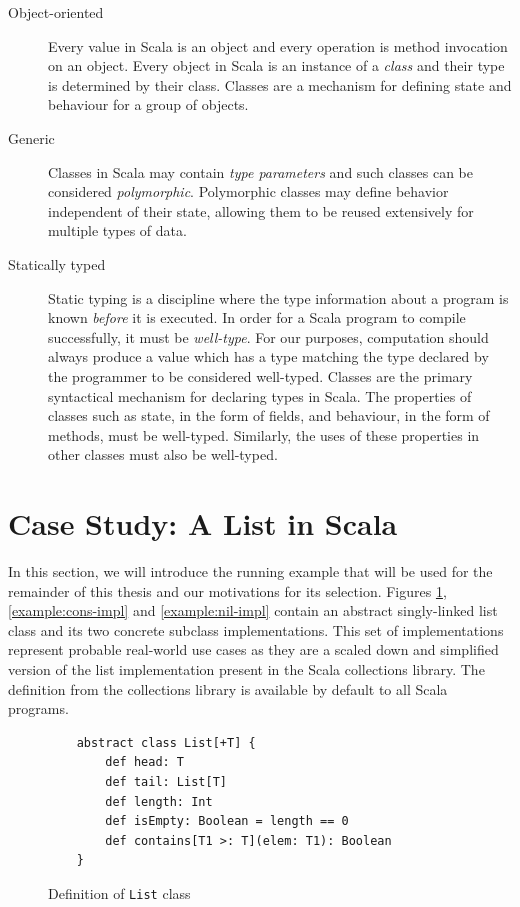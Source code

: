 \begin{description}
	\item[Object-oriented] 
	Every value in Scala is an object and every operation is method invocation on an object. 
	Every object in Scala is an instance of a \textit{class} and their type is determined by their class.
	Classes\cite{simula:classes} are a mechanism for defining state and behaviour for a group of objects.	
	
	\item[Generic] 
	Classes in Scala may contain \textit{type parameters} and such classes can be considered \textit{polymorphic}\cite{strachey:fundamental-concepts}.
	Polymorphic classes may define behavior independent of their state, allowing them to be reused extensively for multiple types of data.
	
	\item[Statically typed] 
	Static typing is a discipline where the type information about a program is known \textit{before} it is executed.
	In order for a Scala program to compile successfully, it must be \textit{well-type}.
	For our purposes, computation should always produce a value which has a type matching the type declared by the programmer to be considered well-typed.
	Classes are the primary syntactical mechanism for declaring types in Scala. 
	The properties of classes such as state, in the form of fields, and behaviour, in the form of methods, must be well-typed.
	Similarly, the uses of these properties in other classes must also be well-typed. 
\end{description}

\section{Case Study: A List in Scala}

In this section, we will introduce the running example that will be used for the remainder of this thesis and our motivations for its selection.
Figures \ref{example:list-def}, \ref{example:cons-impl} and \ref{example:nil-impl} contain an abstract singly-linked list class and its two concrete subclass implementations. 
This set of  implementations represent probable real-world use cases as they are a scaled down and simplified version of the list implementation present in the Scala collections library.
The  definition from the collections library is available by default to all Scala programs.

\begin{figure}[!htb]
	\begin{verbatim}
	abstract class List[+T] {
		def head: T
		def tail: List[T]
		def length: Int
		def isEmpty: Boolean = length == 0
		def contains[T1 >: T](elem: T1): Boolean
	}
	\end{verbatim}
	\caption{Definition of \texttt{List} class}
	\label{example:list-def}
\end{figure}

